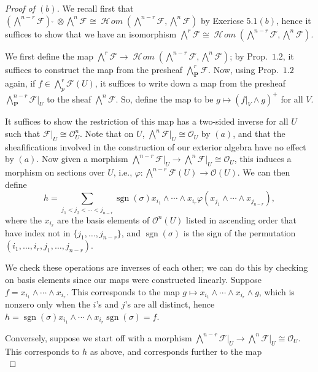 \documentclass[10pt]{article}
\theoremstyle{definition}
\theoremstyle{remark}
\numberwithin{equation}{section}
\numberwithin{figure}{subsubsection}
\DeclareMathOperator{\sgn}{sgn}
\newcommand{\FF}{\mathscr{F}}
\newcommand{\OO}{\mathcal{O}}
\newcommand{\PP}{\mathbf{P}}
\DeclareMathOperator{\HHom}{\mathscr{H}\!\mathit{om}}
\begin{document}
\begin{proof}[Proof of $(b)$]
  We recall first that $(\bigwedge^{n-r}\FF)\:\check{}\: \otimes \bigwedge^n\FF
  \cong \HHom(\bigwedge^{n-r}\FF,\bigwedge^n\FF)$ by Exericse $5.1(b)$, hence it suffices to show that we have an isomorphism $\bigwedge^r\FF \cong \HHom(\bigwedge^{n-r}\FF,\bigwedge^n\FF)$.
  \par We first define the map $\bigwedge^r\FF \to \HHom(\bigwedge^{n-r}\FF,\bigwedge^n\FF)$; by Prop.~$1.2$, it suffices to construct the map from the presheaf $\bigwedge^r_\PP\FF$. Now, using Prop.~$1.2$ again, if $f \in \bigwedge^r_p\FF(U)$, it suffices to write down a map from the presheaf $\bigwedge^{n-r}_\PP\FF\vert_U$ to the sheaf $\bigwedge^n\FF$. So, define the map to be $g \mapsto (f\vert_V \wedge g)^+$ for all $V$.
  \par It suffices to show the restriction of this map has a two-sided inverse for all $U$ such that $\FF\vert_U \cong \OO_U^n$. Note that on $U$, $\bigwedge^n\FF\vert_U \cong \OO_U$ by $(a)$, and that the sheafifications involved in the construction of our exterior algebra have no effect by $(a)$. Now given a morphism $\bigwedge^{n-r}\FF\vert_U \to \bigwedge^n \FF\vert_U \cong \OO_U$, this induces a morphism on sections over $U$, i.e., $\varphi\colon\bigwedge^{n-r}\FF(U) \to \OO(U)$. We can then define
  \begin{equation*}
    h = \sum_{j_1 < j_2 < \cdots < j_{n-r}}\sgn(\sigma)x_{i_1}\wedge\cdots\wedge x_{i_r}\varphi(x_{j_1} \wedge \cdots \wedge x_{j_{n-r}}),
  \end{equation*}
  where the $x_{i_\ell}$ are the basis elements of $\OO^n(U)$ listed in ascending order that have index not in $\{j_1,\ldots,j_{n-r}\}$, and $\sgn(\sigma)$ is the sign of the permutation $(i_1,\ldots,i_r,j_1,\ldots,j_{n-r})$.
  \par We check these operations are inverses of each other; we can do this by checking on basis elements since our maps were constructed linearly. Suppose $f = x_{i_1} \wedge \cdots \wedge x_{i_r}$. This corresponds to the map $g \mapsto x_{i_1} \wedge \cdots \wedge x_{i_r} \wedge g$, which is nonzero only when the $i$'s and $j$'s are all distinct, hence $h = \sgn(\sigma)x_{i_1} \wedge \cdots \wedge x_{i_r}\sgn(\sigma) = f$.
  \par Conversely, suppose we start off with a morphism $\bigwedge^{n-r}\FF\vert_U \to \bigwedge^n \FF\vert_U \cong \OO_U$. This corresponds to $h$ as above, and corresponds further to the map
  \begin{equation*}

\end{equation*}
\end{proof}
\end{document}
